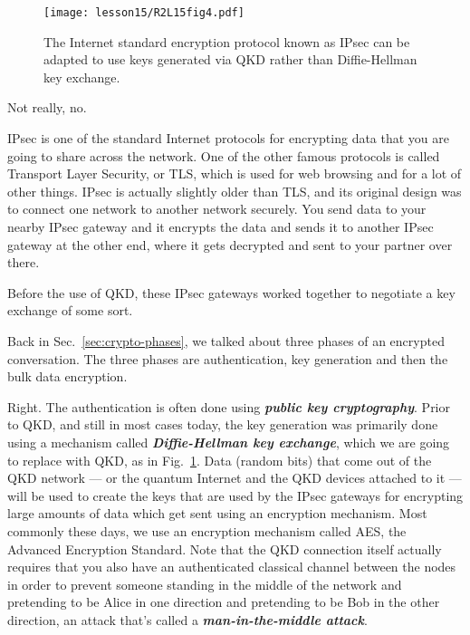 \begin{figure}[t]
    \centering
    \texttt{[image: lesson15/R2L15fig4.pdf]}
    \caption[IPsec with QKD.]{The Internet standard encryption protocol known as IPsec can be adapted to use keys generated via QKD rather than Diffie-Hellman key exchange.}
    \label{fig:15-4-ipsec-with-qkd}
\end{figure}

\mmm Not really, no.

\rrr IPsec is one of the standard Internet protocols for encrypting data that you are going to share across the network. One of the other famous protocols is called Transport Layer Security, or TLS, which is used for web browsing and for a lot of other things. IPsec is actually slightly older than TLS, and its original design was to connect one network to another network securely. You send data to your nearby IPsec gateway and it encrypts the data and sends it to another IPsec gateway at the other end, where it gets decrypted and sent to your partner over there.

Before the use of QKD, these IPsec gateways worked together to negotiate a key exchange of some sort.

\mmm Back in Sec.~\ref{sec:crypto-phases}, we talked about three phases of an encrypted conversation. The three phases are authentication, key generation and then the bulk data encryption.

\rrr Right. The authentication is often done using \textbf{\emph{public key cryptography}}. Prior to QKD, and still in most cases today, the key generation was primarily done using a mechanism called \textbf{\emph{Diffie-Hellman key exchange}}, which we are going to replace with QKD, as in Fig.~\ref{fig:15-4-ipsec-with-qkd}. Data (random bits) that come out of the QKD network --- or the quantum Internet and the QKD devices attached to it --- will be used to create the keys that are used by the IPsec gateways for encrypting large amounts of data which get sent using an encryption mechanism. Most commonly these days, we use an encryption mechanism called AES, the Advanced Encryption Standard. Note  that the QKD connection itself actually requires that you also have an authenticated classical channel between the nodes in order to prevent someone standing in the middle of the network and pretending to be Alice in one direction and pretending to be Bob in the other direction, an attack that's called a \textbf{\emph{man-in-the-middle attack}}.

